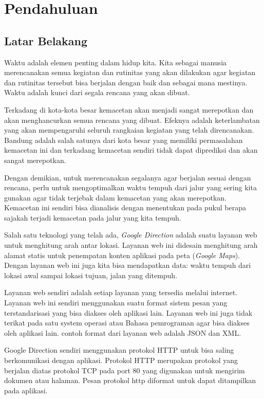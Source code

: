 \chapter{Pendahuluan}
\label{chap:intro}
   
\section{Latar Belakang}
\label{sec:label}
Waktu adalah elemen penting dalam hidup kita. Kita sebagai manusia merencanakan semua kegiatan dan rutinitas yang akan dilakukan agar kegiatan dan rutinitas tersebut bisa berjalan dengan baik dan sebagai mana mestinya. Waktu adalah kunci dari segala rencana yang akan dibuat.

Terkadang di kota-kota besar kemacetan akan menjadi sangat merepotkan dan akan menghancurkan semua rencana yang dibuat. Efeknya adalah keterlambatan
yang akan mempengaruhi seluruh rangkaian kegiatan yang telah direncanakan. Bandung adalah salah satunya dari kota besar yang memiliki permasalahan kemacetan ini dan terkadang kemacetan sendiri tidak dapat diprediksi dan akan sangat merepotkan.

Dengan demikian, untuk merencanakan segalanya agar berjalan sesuai dengan rencana, perlu untuk mengoptimalkan waktu tempuh dari jalur yang sering kita gunakan agar tidak terjebak dalam kemacetan yang akan merepotkan. Kemacetan ini sendiri bisa dianalisis dengan menentukan pada pukul berapa sajakah terjadi kemacetan pada jalur yang kita tempuh.

Salah satu teknologi yang telah ada, \textit{Google Direction} adalah suatu layanan web untuk menghitung arah antar lokasi. Layanan web ini didesain menghitung arah alamat statis untuk penempatan konten aplikasi pada peta (\textit{Google Maps}). Dengan layanan web ini juga kita bisa mendapatkan data: waktu tempuh dari lokasi awal sampai lokasi tujuan, jalan yang ditempuh.

Layanan web sendiri adalah setiap layanan yang tersedia melalui internet.
Layanan web ini sendiri menggunakan suatu format sistem pesan yang terstandarisasi yang bisa diakses oleh aplikasi lain. Layanan web ini juga tidak terikat pada satu system operasi atau Bahasa pemrograman agar bisa diakses oleh aplikasi lain. contoh format dari layanan web adalah JSON dan XML.

Google Direction sendiri menggunakan protokol HTTP untuk bisa saling berkomunikasi dengan aplikasi. Protokol HTTP merupakan protokol yang berjalan diatas protokol TCP pada port 80 yang digunakan untuk mengirim dokumen atau halaman. Pesan protokol http diformat untuk dapat ditampilkan pada aplikasi.

